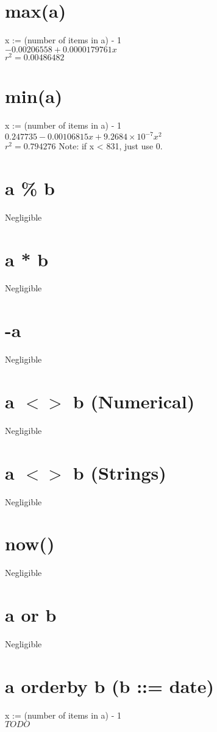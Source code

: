 \documentclass[12pt]{article}
\begin{document}
	\section{max(a)}
	x := (number of items in a) - 1\\
	$-0.00206558 + 0.0000179761 x$\\
	$r^2 = 0.00486482$
	
	\section{min(a)}
	x := (number of items in a) - 1\\
	$0.247735 - 0.00106815 x + 9.2684 \times 10^{-7} x^2$\\
	$r^2 = 0.794276$
	Note: if x < 831, just use 0.
	
	\section{a \% b}
	Negligible
	
	\section{a * b}
	Negligible
	
	\section{-a}
	Negligible
	
	\section{a $<>$ b (Numerical)}
	Negligible
	
	\section{a $<>$ b (Strings)}
	Negligible
	
	\section{now()}
	Negligible
	
	\section{a or b}
	Negligible
	
	\section{a orderby b (b ::= date)}
	x := (number of items in a) - 1\\
	$TODO$
	
\end{document}
